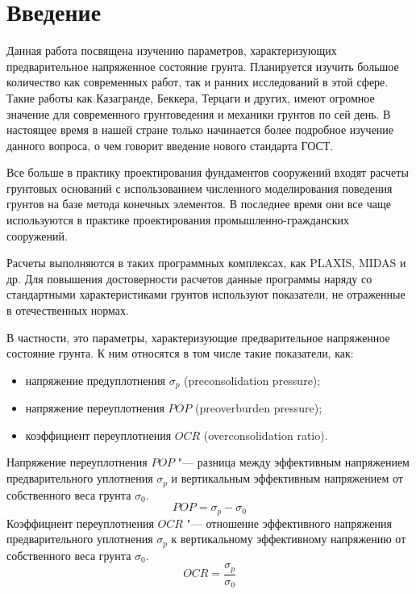 \chapter*{Введение}                         %

Данная работа посвящена изучению параметров, характеризующих предварительное напряженное состояние грунта. Планируется изучить большое количество как современных работ, так и ранних исследований в этой сфере. Такие работы как Казагранде, Беккера, Терцаги и других, имеют огромное значение для современного грунтоведения и механики грунтов по сей день.
В настоящее время в нашей стране только начинается более подробное изучение данного вопроса, о чем говорит введение нового стандарта ГОСТ. 

Все больше в практику проектирования фундаментов сооружений входят расчеты грунтовых оснований с использованием численного моделирования поведения грунтов на базе метода конечных элементов. 
В последнее время они все чаще используются в практике проектирования промышленно-гражданских сооружений. 

Расчеты выполняются в таких программных комплексах, как PLAXIS, MIDAS и др. 
Для повышения достоверности расчетов данные программы наряду со стандартными характеристиками грунтов используют показатели, не отраженные в отечественных нормах. 

В частности, это параметры, характеризующие предварительное напряженное состояние грунта. 
К ним относятся в том числе такие показатели, как:
\begin{itemize}
    \item напряжение предуплотнения $\sigma_p$ (preconsolidation pressure);
    \item напряжение переуплотнения $POP$ (preoverburden pressure);
    \item коэффициент переуплотнения $OCR$ (overconsolidation ratio).
\end{itemize}

Напряжение переуплотнения $POP$ "--- разница между эффективным напряжением предвари­тельного уплотнения $\sigma_p$ и вертикальным эффективным напряжением от собственного веса грунта $\sigma_0$.
$$POP = \sigma_p - \sigma_0$$
Коэффициент переуплотнения $OCR$ "---  отношение эффективного напряжения предваритель­ного уплотнения $\sigma_p$ к вертикальному эффективному напряжению от собственного веса грунта $\sigma_0$.
$$OCR = \frac{\sigma_p}{\sigma_0}$$


